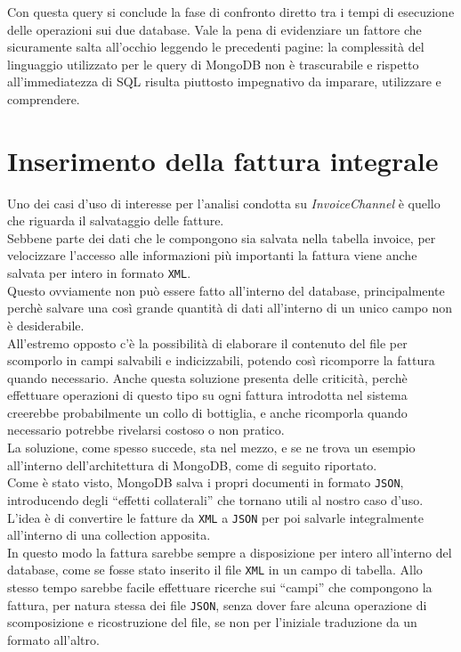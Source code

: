 \noindent Con questa query si conclude la fase di confronto diretto tra i tempi di esecuzione delle operazioni sui due database. Vale la pena di evidenziare un fattore che sicuramente salta all'occhio leggendo le precedenti pagine: la complessità del linguaggio utilizzato per le query di MongoDB non è trascurabile e rispetto all'immediatezza di \gls{SQL} risulta piuttosto impegnativo da imparare, utilizzare e comprendere.

\section{Inserimento della fattura integrale}
\label{sec:fattura-integrale}
Uno dei casi d'uso di interesse per l'analisi condotta su \textit{InvoiceChannel} è quello che riguarda il salvataggio delle fatture.\\
Sebbene parte dei dati che le compongono sia salvata nella tabella invoice, per velocizzare l'accesso alle informazioni più importanti la fattura viene anche salvata per intero in formato \texttt{XML}.\\

\noindent Questo ovviamente non può essere fatto all'interno del database, principalmente perchè salvare una così grande quantità di dati all'interno di un unico campo non è desiderabile.\\
All'estremo opposto c'è la possibilità di elaborare il contenuto del file per scomporlo in campi salvabili e indicizzabili, potendo così ricomporre la fattura quando necessario. Anche questa soluzione presenta delle criticità, perchè effettuare operazioni di questo tipo su ogni fattura introdotta nel sistema creerebbe probabilmente un collo di bottiglia, e anche ricomporla quando necessario potrebbe rivelarsi costoso o non pratico.\\

\noindent La soluzione, come spesso succede, sta nel mezzo, e se ne trova un esempio all'interno dell'architettura di MongoDB, come di seguito riportato.\\
Come è stato visto, MongoDB salva i propri documenti in formato \texttt{JSON}, introducendo degli ``effetti collaterali'' che tornano utili al nostro caso d'uso.\\
L'idea è di convertire le fatture da \texttt{XML} a \texttt{JSON} per poi salvarle integralmente all'interno di una collection apposita.\\
In questo modo la fattura sarebbe sempre a disposizione per intero all'interno del database, come se fosse stato inserito il file \texttt{XML} in un campo di tabella. Allo stesso tempo sarebbe facile effettuare ricerche sui ``campi'' che compongono la fattura, per natura stessa dei file \texttt{JSON}, senza dover fare alcuna operazione di scomposizione e ricostruzione del file, se non per l'iniziale traduzione da un formato all'altro.\\

